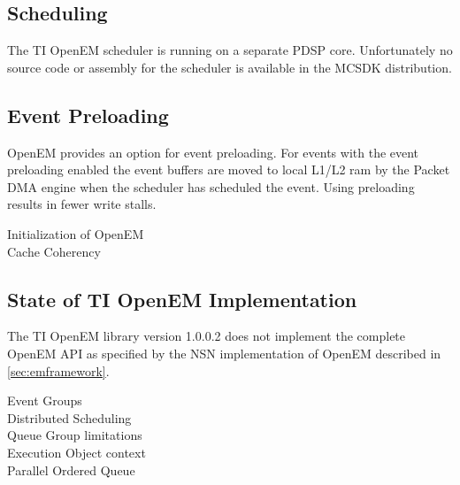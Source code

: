 \subsection{Scheduling}
The TI OpenEM scheduler is running on a separate PDSP core. Unfortunately no
source code or assembly for the scheduler is available in the MCSDK distribution.

\subsection{Event Preloading}
OpenEM provides an option for event preloading. For events with the event
preloading enabled the event buffers are moved to local L1/L2 ram by the Packet
DMA engine when the scheduler has scheduled the event. Using preloading results
in fewer write stalls. \cite{openemwhite}

Initialization of OpenEM\\
Cache Coherency
\subsection{State of TI OpenEM Implementation}
The TI OpenEM library version 1.0.0.2 does not implement the complete OpenEM API
as specified by the NSN implementation of OpenEM described in
\ref{sec:emframework}.

Event Groups\\
Distributed Scheduling\\
Queue Group limitations\\
Execution Object context\\
Parallel Ordered Queue\\


